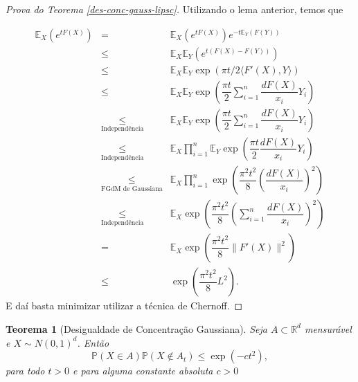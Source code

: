 \documentclass[12pt,a4paper,oneside]{book}
\newtheorem{theorem}{Teorema}[section]
\theoremstyle{definition}
\theoremstyle{remark}
\numberwithin{equation}{section}
\newcommand{\R}{\mathbb{R}}
\newcommand{\E}{\mathbb{E}}
\newcommand{\pr}{\mathbb{P}}
\newcommand{\ds}{\displaystyle}
\begin{document}
\begin{proof}[Prova do Teorema \ref{des-conc-gauss-lipsc}]
Utilizando o lema anterior, temos que

$$
\begin{array}{lcl}
\E_X(e^{tF(X)}) & = &\E_X(e^{tF(X)})e^{-t\E_Y(F(Y))}\\ 
&\leq& \E_X\E_Y(e^{t(F(X)-F(Y))})\\ 
&\leq& \E_X\E_Y\exp({\pi t/2 \langle F'(X),Y \rangle})\\  
&\leq& \E_X\E_Y\exp\left(\dfrac{\pi t}{2}     \ds  \sum_{i=1}^n \dfrac{d F(X)}{x_i}Y_i        \right)\\  
&\underset{\textrm{Independência}}{\leq}&\E_X\E_Y\exp\left(\dfrac{\pi t}{2}       \ds\sum_{i=1}^n \dfrac{d F(X)}{x_i}Y_i        \right)\\ 
&\underset{\textrm{Independência}}{\leq}&\E_X\ds\prod_{i=1}^n\E_Y\exp\left(\dfrac{\pi t}{2}        \dfrac{d F(X)}{x_i}Y_i        \right)\\ 
&\underset{\textrm{FGdM de Gaussiana}}{\leq}&\E_X\ds\prod_{i=1}^n\exp\left(\dfrac{\pi^2 t^2}{8}       \left( \dfrac{d F(X)}{x_i}\right)^2     \right)\\ 
&\underset{\textrm{Independência}}{\leq}&\E_X\ds\exp\left(\dfrac{\pi^2 t^2}{8}       \left( \ds\sum_{i=1}^n\dfrac{d F(X)}{x_i}\right)^2     \right)\\ 
&=&\E_X\ds\exp\left(\dfrac{\pi^2 t^2}{8}       \|F'(X)\|^2     \right)\\ 
&\leq &\exp\left(\dfrac{\pi^2 t^2}{8}       L^2     \right).
\end{array}
$$
E daí basta minimizar utilizar a técnica de Chernoff.
\end{proof}


\begin{theorem}[Desigualdade de Concentração Gaussiana]\label{des-con-gauss-A_t} Seja $A\subset \R^d$ mensurável e $X\sim N(0,1)^d$. Então
$$\pr(X\in A)\pr(X\not\in A_t)\leq \exp(-ct^2), $$
para todo $t>0$ e para alguma constante absoluta $c>0$
\end{theorem}
\end{document}
